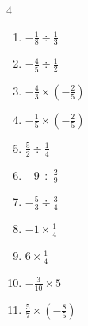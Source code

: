 \begin{multicols}{4}
\begin{enumerate}
        \phantom{$\displaystyle =6$}

  \item $\displaystyle -\frac{1}{8}\div{}\frac{1}{3}$


  \item $\displaystyle -\frac{4}{5}\div{}\frac{1}{2}$


  \item $\displaystyle -\frac{4}{3}\times{}\left(-\frac{2}{5}\right)$


  \item $\displaystyle -\frac{1}{5}\times{}\left(-\frac{2}{5}\right)$


  \item $\displaystyle \frac{5}{2}\div{}\frac{1}{4}$

        \phantom{$\displaystyle =10$}

  \item $\displaystyle -9\div{}\frac{2}{9}$


  \item $\displaystyle -\frac{5}{3}\div{}\frac{3}{4}$


  \item $\displaystyle -1\times{}\frac{1}{4}$


\columnbreak %

  \item $\displaystyle 6\times{}\frac{1}{4}$


  \item $\displaystyle -\frac{3}{10}\times{}5$


  \item $\displaystyle \frac{5}{7}\times{}\left(-\frac{8}{5}\right)$



\end{enumerate}
\end{multicols}
